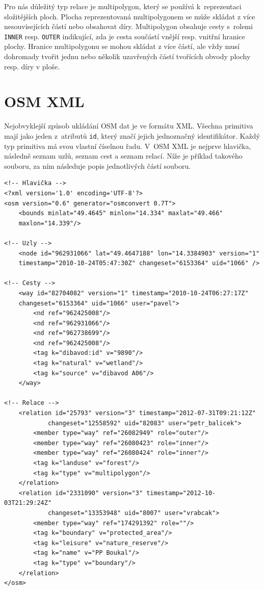Pro nás důležitý typ relace je {\tuc multipolygon}, který se používá k~reprezentaci
složitějších ploch. Plocha reprezentovaná multipolygonem se může skládat z více
nesouvisejících částí nebo obsahovat díry. Multipolygon obsahuje cesty s~rolemi 
\verb|INNER| resp. \verb|OUTER| indikující, zda je cesta součástí vnější resp.
vnitřní hranice plochy. Hranice multipolygonu se mohou skládat z více částí, ale
vždy musí dohromady tvořit jednu nebo několik uzavřených částí tvořících obvody 
plochy resp. díry v ploše.

\section{OSM XML}
Nejobvyklejší způsob ukládání OSM dat je ve formátu XML. Všechna primitiva mají
jako jeden z~atributů \verb|id|, který značí jejich jednoznačný identifikátor.
Každý typ primitiva má svou vlastní číselnou řadu. V~OSM XML \cite{osmxml} je
nejprve hlavička, následně seznam uzlů, seznam cest a seznam relací. Níže je
příklad takového souboru, za ním následuje popis jednotlivých částí souboru.

\begin{verbatim}
<!-- Hlavička -->
<?xml version='1.0' encoding='UTF-8'?>
<osm version="0.6" generator="osmconvert 0.7T">
	<bounds minlat="49.4645" minlon="14.334" maxlat="49.466" 
	maxlon="14.339"/>

<!-- Uzly -->
	<node id="962931066" lat="49.4647188" lon="14.3384903" version="1" 
	timestamp="2010-10-24T05:47:30Z" changeset="6153364" uid="1066" />

<!-- Cesty -->
	<way id="82704082" version="1" timestamp="2010-10-24T06:27:17Z" 
	changeset="6153364" uid="1066" user="pavel">
	    <nd ref="962425008"/>
	    <nd ref="962931066"/>
	    <nd ref="962738699"/>
	    <nd ref="962425008"/>
	    <tag k="dibavod:id" v="9890"/>
	    <tag k="natural" v="wetland"/>
	    <tag k="source" v="dibavod A06"/>
	</way>

<!-- Relace -->
	<relation id="25793" version="3" timestamp="2012-07-31T09:21:12Z" 
			changeset="12558592" uid="82083" user="petr_balicek">
	    <member type="way" ref="26082949" role="outer"/>
	    <member type="way" ref="26080423" role="inner"/>
	    <member type="way" ref="26080424" role="inner"/>
	    <tag k="landuse" v="forest"/>
	    <tag k="type" v="multipolygon"/>
	</relation>
	<relation id="2331090" version="3" timestamp="2012-10-03T21:29:24Z"
			changeset="13353948" uid="8007" user="vrabcak">
	    <member type="way" ref="174291392" role=""/>
	    <tag k="boundary" v="protected_area"/>
	    <tag k="leisure" v="nature_reserve"/>
	    <tag k="name" v="PP Boukal"/>
	    <tag k="type" v="boundary"/>
	</relation>
</osm>
\end{verbatim}

